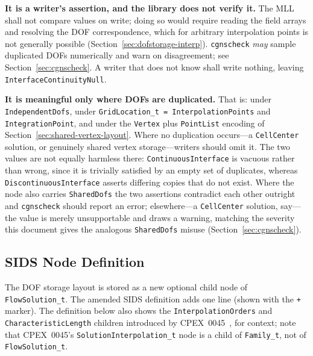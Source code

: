 \documentclass[11pt,letterpaper]{article}
\begin{document}
\textbf{It is a writer's assertion, and the library does not verify it.}
The MLL shall not compare values on write; doing so would require
reading the field arrays and resolving the DOF correspondence, which for
arbitrary interpolation points is not generally possible
(Section~\ref{sec:dofstorage-interp}).  \texttt{cgnscheck} \emph{may}
sample duplicated DOFs numerically and warn on disagreement; see
Section~\ref{sec:cgnscheck}.  A writer that does not know shall write
nothing, leaving \texttt{InterfaceContinuityNull}.

\textbf{It is meaningful only where DOFs are duplicated.}  That is:
under \texttt{IndependentDofs}, under
\texttt{GridLocation\_t = InterpolationPoints} and
\texttt{IntegrationPoint}, and under the \texttt{Vertex} plus
\texttt{PointList} encoding of
Section~\ref{sec:shared-vertex-layout}.  Where no duplication
occurs---a \texttt{CellCenter} solution, or genuinely shared vertex
storage---writers should omit it.  The two values are not equally
harmless there: \texttt{ContinuousInterface} is vacuous rather than
wrong, since it is trivially satisfied by an empty set of duplicates,
whereas \texttt{DiscontinuousInterface} asserts differing copies that do
not exist.  Where the node also carries \texttt{SharedDofs} the two
assertions contradict each other outright and \texttt{cgnscheck} should
report an error; elsewhere---a \texttt{CellCenter} solution, say---the
value is merely unsupportable and draws a warning, matching the severity
this document gives the analogous \texttt{SharedDofs} misuse
(Section~\ref{sec:cgnscheck}).

\subsection{SIDS Node Definition}
\label{sec:sids-node}

The DOF storage layout is stored as a new optional child node of
\texttt{FlowSolution\_t}.  The amended SIDS definition adds one line
(shown with the \texttt{+} marker).  The definition below also shows the
\texttt{InterpolationOrders} and \texttt{CharacteristicLength} children
introduced by CPEX~0045~\cite{cpex0045}, for context; note that
CPEX~0045's \texttt{SolutionInterpolation\_t} node is a child of
\texttt{Family\_t}, not of \texttt{FlowSolution\_t}.
\end{document}
